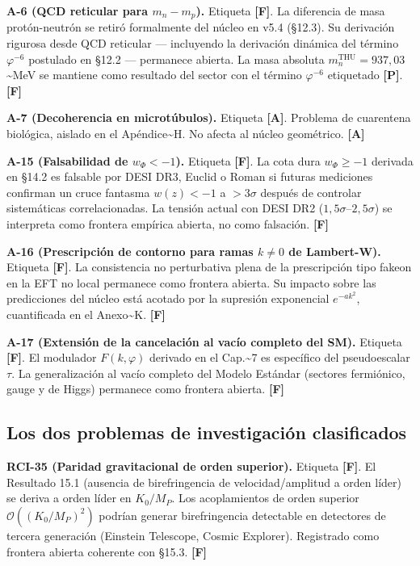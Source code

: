 ﻿\documentclass[11pt,letterpaper]{article}
\begin{document}
\textbf{A-6 (QCD reticular para $m_n - m_p$).} Etiqueta \textbf{[F]}. La diferencia de masa protón-neutrón se retiró formalmente del núcleo en v5.4 (§12.3). Su derivación rigurosa desde QCD reticular --- incluyendo la derivación dinámica del término $\varphi^{-6}$ postulado en §12.2 --- permanece abierta. La masa absoluta $m_n^{\text{THU}} = 937{,}03$\textasciitilde{}MeV se mantiene como resultado del sector con el término $\varphi^{-6}$ etiquetado \textbf{[P]}. \textbf{[F]}

\textbf{A-7 (Decoherencia en microtúbulos).} Etiqueta \textbf{[A]}. Problema de cuarentena biológica, aislado en el Apéndice\textasciitilde{}H. No afecta al núcleo geométrico. \textbf{[A]}

\textbf{A-15 (Falsabilidad de $w_\Phi < -1$).} Etiqueta \textbf{[F]}. La cota dura $w_\Phi \geq -1$ derivada en §14.2 es falsable por DESI DR3, Euclid o Roman si futuras mediciones confirman un cruce fantasma $w(z) < -1$ a $> 3\sigma$ después de controlar sistemáticas correlacionadas. La tensión actual con DESI DR2 ($1{,}5\sigma$--$2{,}5\sigma$) se interpreta como frontera empírica abierta, no como falsación. \textbf{[F]}

\textbf{A-16 (Prescripción de contorno para ramas $k \neq 0$ de Lambert-W).} Etiqueta \textbf{[F]}. La consistencia no perturbativa plena de la prescripción tipo fakeon en la EFT no local permanece como frontera abierta. Su impacto sobre las predicciones del núcleo está acotado por la supresión exponencial $e^{-ak^2}$, cuantificada en el Anexo\textasciitilde{}K. \textbf{[F]}

\textbf{A-17 (Extensión de la cancelación al vacío completo del SM).} Etiqueta \textbf{[F]}. El modulador $F(k, \varphi)$ derivado en el Cap.\textasciitilde{}7 es específico del pseudoescalar $\tau$. La generalización al vacío completo del Modelo Estándar (sectores fermiónico, gauge y de Higgs) permanece como frontera abierta. \textbf{[F]}
\subsection{Los dos problemas de investigación clasificados}
\textbf{RCI-35 (Paridad gravitacional de orden superior).} Etiqueta \textbf{[F]}. El Resultado 15.1 (ausencia de birefringencia de velocidad/amplitud a orden líder) se deriva a orden líder en $K_0/M_P$. Los acoplamientos de orden superior $\mathcal{O}((K_0/M_P)^2)$ podrían generar birefringencia detectable en detectores de tercera generación (Einstein Telescope, Cosmic Explorer). Registrado como frontera abierta coherente con §15.3. \textbf{[F]}
\end{document}
